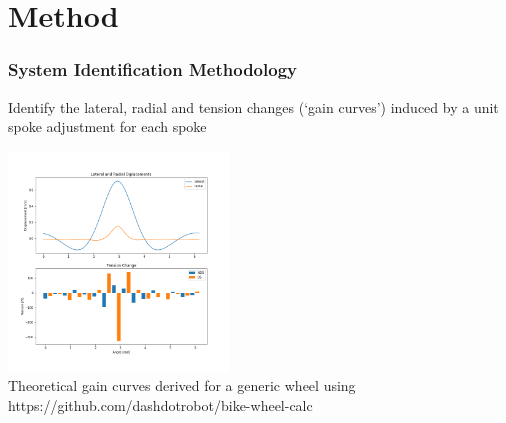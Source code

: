 \documentclass[mathserif]{beamer}
\begin{document}
\section{Method}
 
\begin{frame}
  \frametitle{System Identification Methodology}
  \centering
  \begin{block}{}
  Identify the lateral, radial and tension changes (`gain curves') induced by a unit spoke adjustment for each spoke
  \end{block}
  	\includegraphics[height=2.3in]{GainCurveTheory}\\
	{\tiny Theoretical gain curves derived for a generic wheel using https://github.com/dashdotrobot/bike-wheel-calc}
\end{frame}
\end{document}
